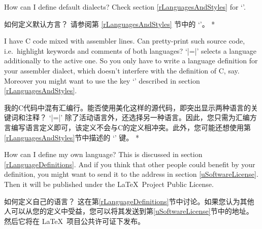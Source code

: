 \begin{advise}
\begin{paracol}{2}
\item How can I define default dialects?
      \advisespace
      Check section \ref{rLanguagesAndStyles} for `'.
\switchcolumn
\item 如何定义默认方言？
\advisespace
请参阅第 \ref{rLanguagesAndStyles} 节中的 `'。
\switchcolumn[0]*%
\item I have C code mixed with assembler lines. Can 
      pretty-print such source code, i.e.~highlight keywords and comments of
      both languages?
      \advisespace
      `|=|' selects a
      language additionally to the active one. So you only have to write a
      language definition for your assembler dialect, which doesn't interfere
      with the definition of C, say. Moreover you might want to use the key
      `' described in section \ref{rLanguagesAndStyles}.
\switchcolumn
\item 我的C代码中混有汇编行。能否使用美化这样的源代码，即突出显示两种语言的关键词和注释？
\advisespace
`|=|' 除了活动语言外，还选择另一种语言。因此，您只需为汇编方言编写语言定义即可，该定义不会与C的定义相冲突。此外，您可能还想使用第\ref{rLanguagesAndStyles}节中描述的 `' 键。
\switchcolumn[0]*%
\item How can I define my own language?
      \advisespace
      This is discussed in section \ref{rLanguageDefinitions}. And if you
      think that other people could benefit by your definition, you might
      want to send it to the address in section \ref{uSoftwareLicense}.
      Then it will be published under the \LaTeX\ Project Public License.
\switchcolumn
\item 如何定义自己的语言？
\advisespace
这在第\ref{rLanguageDefinitions}节中讨论。如果您认为其他人可以从您的定义中受益，您可以将其发送到第\ref{uSoftwareLicense}节中的地址。然后它将在 \LaTeX\ 项目公共许可证下发布。
\end{paracol}
\end{advise}
